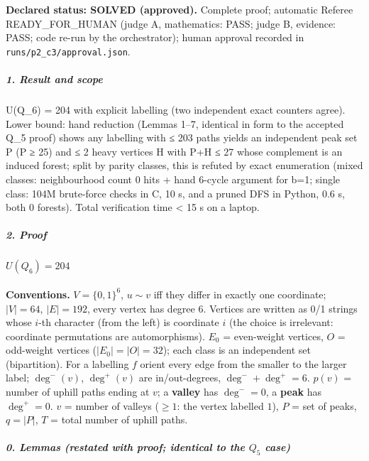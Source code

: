 \documentclass[11pt,a4paper]{article}
\begin{document}
\textbf{Declared status: SOLVED (approved).} Complete proof; automatic
Referee READY\_FOR\_HUMAN (judge A, mathematics: PASS; judge B,
evidence: PASS; code re-run by the orchestrator); human approval
recorded in \texttt{runs/p2\_c3/approval.json}.

\subparagraph{1. Result and scope}\label{result-and-scope}

U(Q\_6) = 204 with explicit labelling (two independent exact counters
agree). Lower bound: hand reduction (Lemmas 1--7, identical in form to
the accepted Q\_5 proof) shows any labelling with ≤ 203 paths yields an
independent peak set P (\textbar P\textbar{} ≥ 25) and ≤ 2 heavy
vertices H with \textbar P\textbar+\textbar H\textbar{} ≤ 27 whose
complement is an induced forest; split by parity classes, this is
refuted by exact enumeration (mixed classes: neighbourhood count 0 hits
+ hand 6-cycle argument for b=1; single class: 104M brute-force checks
in C, 10 s, and a pruned DFS in Python, 0.6 s, both 0 forests). Total
verification time \textless{} 15 s on a laptop.

\subparagraph{2. Proof}\label{proof}

\paragraph{\texorpdfstring{\(U(Q_6)=204\)}{U(Q\_6)=204}}\label{uq_6204}

\textbf{Conventions.} \(V=\{0,1\}^6\), \(u\sim v\) iff they differ in
exactly one coordinate; \(|V|=64\), \(|E|=192\), every vertex has degree
\(6\). Vertices are written as 0/1 strings whose \(i\)-th character
(from the left) is coordinate \(i\) (the choice is irrelevant:
coordinate permutations are automorphisms). \(E_0\) = even-weight
vertices, \(O\) = odd-weight vertices (\(|E_0|=|O|=32\)); each class is
an independent set (bipartition). For a labelling \(f\) orient every
edge from the smaller to the larger label; \(\deg^-(v)\), \(\deg^+(v)\)
are in/out-degrees, \(\deg^-+\deg^+=6\). \(p(v)\) = number of uphill
paths ending at \(v\); a \textbf{valley} has \(\deg^-=0\), a
\textbf{peak} has \(\deg^+=0\). \(v\) = number of valleys (\(\ge1\): the
vertex labelled \(1\)), \(P\) = set of peaks, \(q=|P|\), \(T\) = total
number of uphill paths.

\subparagraph{\texorpdfstring{0. Lemmas (restated with proof; identical
to the \(Q_5\)
case)}{0. Lemmas (restated with proof; identical to the Q\_5 case)}}\label{lemmas-restated-with-proof-identical-to-the-q_5-case}
\end{document}
